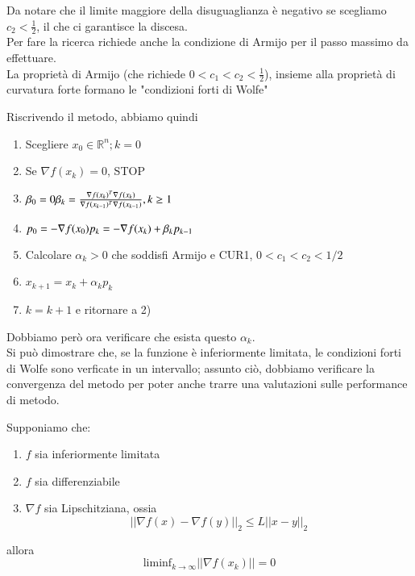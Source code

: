 Da notare che il limite maggiore della disuguaglianza \`e negativo se
scegliamo $c_2 < \frac{1}{2}$, il che ci garantisce la discesa. \\ Per
fare la ricerca richiede anche la condizione di Armijo per il passo
massimo da effettuare. \\ La proprietà di Armijo (che richiede $0< c_1
< c_2 < \frac{1}{2}$), insieme alla proprietà di curvatura forte
formano le "condizioni forti di Wolfe"

Riscrivendo il metodo, abbiamo quindi
\begin{enumerate}
 \item Scegliere $x_0 \in \mathbb{R}^{n}; k =0$
 \item Se $\nabla f(x_{k}) = 0$, STOP
 \item $ \beta_{0} = 0 \\ \beta_{k} = \frac{\nabla f(x_{k})^{T} \nabla
f(x_{k})} {\nabla f(x_{k-1})^{T} \nabla f(x_{k-1})}, k \geq 1$
 \item $ p_{0} = -\nabla f(x_{0}) \\ p_{k} = -\nabla f(x_{k}) +
\beta_{k} p_{k-1} \quad$
  \item Calcolare $\alpha_{k}>0$ che soddisfi Armijo e CUR1, \quad $0
< c_1 < c_2 < 1/2$
\item $x_{k+1} = x_{k} + \alpha_{k} p_{k}$
 \item $k = k+1$ e ritornare a 2)
\end{enumerate} Dobbiamo però ora verificare che esista questo
$\alpha_{k}$. \\ Si può dimostrare che, se la funzione \`e inferiormente
limitata, le condizioni forti di Wolfe sono verficate in un
intervallo; assunto ciò, dobbiamo verificare la convergenza del metodo
per poter anche trarre una valutazioni sulle performance di metodo.
\begin{theo}[Convergenza] Supponiamo che:
\begin{enumerate}
 \item $f$ sia inferiormente limitata
 \item $f$ sia differenziabile
  \item $\nabla f$ sia Lipschitziana, ossia
	$$ ||\nabla f(x) - \nabla f(y)||_{2} \leq L || x-y||_{2}$$
\end{enumerate} allora
 $$ \text{liminf}_{k \to \infty} ||  \nabla f(x_{k}) || = 0$$
\end{theo}


